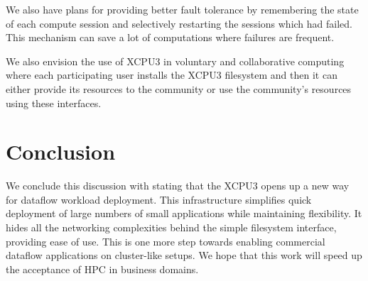 We also have plans for providing better fault tolerance by remembering the
state of each compute session and selectively restarting the sessions which had
failed.  This mechanism can save a lot of computations where failures are
frequent.

We also envision the use of XCPU3 in voluntary and collaborative computing
where each participating user installs the XCPU3 filesystem and then it can
either provide its resources to the community or use the community's resources
using these interfaces.


\section{Conclusion}
We conclude this discussion with stating that the XCPU3 opens up a new way for
dataflow workload deployment.  This infrastructure simplifies quick deployment
of large numbers of small applications while maintaining flexibility. It
hides all the networking complexities behind the simple filesystem interface,
providing ease of use.  This is one more step towards enabling commercial
dataflow applications on cluster-like setups.  We hope that this work will
speed up the acceptance of HPC in business domains.





